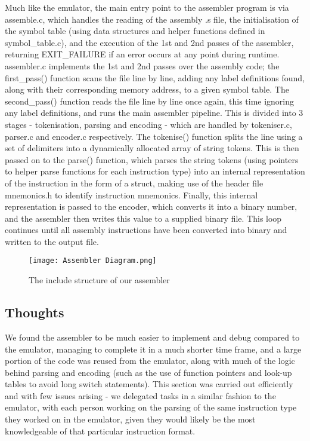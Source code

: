\documentclass{article}
\begin{document}
Much like the emulator, the main entry point to the assembler program is via assemble.c, which handles the reading of the assembly .s file, the initialisation of the symbol table (using data structures and helper functions defined in symbol\_table.c), and the execution of the 1st and 2nd passes of the assembler, returning EXIT\_FAILURE if an error occurs at any point during runtime.
assembler.c implements the 1st and 2nd passes over the assembly code; the first\_pass() function scans the file line by line, adding any label definitions found, along with their corresponding memory address, to a given symbol table. The second\_pass() function reads the file line by line once again, this time ignoring any label definitions, and runs the main assembler pipeline. This is divided into 3 stages - tokenisation, parsing and encoding - which are handled by tokeniser.c, parser.c and encoder.c respectively.
The tokenise() function splits the line using a set of delimiters into a dynamically allocated array of string tokens. This is then passed on to the parse() function, which parses the string tokens (using pointers to helper parse functions for each instruction type) into an internal representation of the instruction in the form of a struct, making use of the header file mnemonics.h to identify instruction mnemonics. Finally, this internal representation is passed to the encoder, which converts it into a binary number, and the assembler then writes this value to a supplied binary file. This loop continues until all assembly instructions have been converted into binary and written to the output file.

\begin{figure}[h]
\centering
\texttt{[image: Assembler Diagram.png]}
\caption{The include structure of our assembler}
\end{figure}

\subsection{Thoughts}

We found the assembler to be much easier to implement and debug compared to the emulator, managing to complete it in a much shorter time frame, and a large portion of the code was reused from the emulator, along with much of the logic behind parsing and encoding (such as the use of function pointers and look-up tables to avoid long switch statements). This section was carried out efficiently and with few issues arising - we delegated tasks in a similar fashion to the emulator, with each person working on the parsing of the same instruction type they worked on in the emulator, given they would likely be the most knowledgeable of that particular instruction format.
\end{document}
